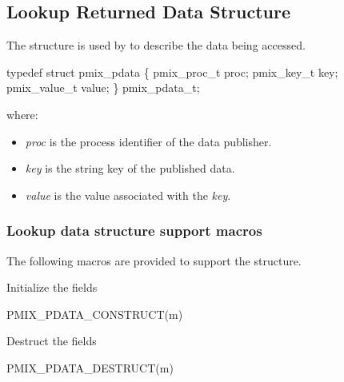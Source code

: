 \subsection{Lookup Returned Data Structure}

The  structure is used by  to describe the data being accessed.

\cspecificstart
\begin{codepar}
typedef struct pmix_pdata \{
    pmix_proc_t proc;
    pmix_key_t key;
    pmix_value_t value;
\} pmix_pdata_t;
\end{codepar}
\cspecificend

where:
\begin{itemize}
    \item \emph{proc} is the process identifier of the data publisher.
    \item \emph{key} is the string key of the published data.
    \item \emph{value} is the value associated with the \emph{key}.
\end{itemize}


\subsubsection{Lookup data structure support macros}

The following macros are provided to support the  structure.


Initialize the  fields

\cspecificstart
\begin{codepar}
PMIX_PDATA_CONSTRUCT(m)
\end{codepar}
\cspecificend

\begin{arglist}
\end{arglist}


Destruct the  fields

\cspecificstart
\begin{codepar}
PMIX_PDATA_DESTRUCT(m)
\end{codepar}
\cspecificend

